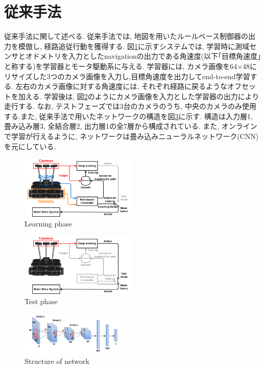 \documentclass{ujarticle}
\begin{document}
\section{従来手法}%
従来手法に関して述べる. 従来手法では, 地図を用いたルールベース制御器の出力を模倣し, 経路追従行動を獲得する. 図\ref{Fig:si2020-okada}に示すシステムでは, 学習時に測域センサとオドメトリを入力としたnavigation\cite{navigation}の出力である角速度(以下｢目標角速度｣と称する)を学習器とモータ駆動系に与える. 学習器には, カメラ画像を64×48にリサイズした3つのカメラ画像を入力し,目標角速度を出力してend-to-end学習する. 左右のカメラ画像に対する角速度には, それぞれ経路に戻るようなオフセットを加える. 学習後は, 図\ref{Fig:si2020-okada-test}のようにカメラ画像を入力とした学習器の出力により走行する. なお, テストフェーズでは3台のカメラのうち, 中央のカメラのみ使用する.また, 従来手法で用いたネットワークの構造を図\ref{Fig:cnn}に示す. 構造は入力層1, 畳み込み層3, 全結合層2, 出力層1の全7層から構成されている. また, オンラインで学習が行えるように, ネットワークは畳み込みニューラルネットワーク(CNN)を元にしている. 

\begin{figure}[h]
		\centering
		\includegraphics[width=0.5\textwidth]{img/si2020-okada.png}
		\caption{Learning phase}
		\label{Fig:si2020-okada}
\end{figure}

\begin{figure}[h]
	\centering
	\includegraphics[width=0.5\textwidth]{img/si2020-okada-test.png}
	\caption{Test phase}
	\label{Fig:si2020-okada-test}
\end{figure}

\begin{figure}[h]
	\centering
	\includegraphics[width=0.45\textwidth]{img/cnn.png}
	\caption{Structure of network}
	\label{Fig:cnn}
\end{figure}
\end{document}
